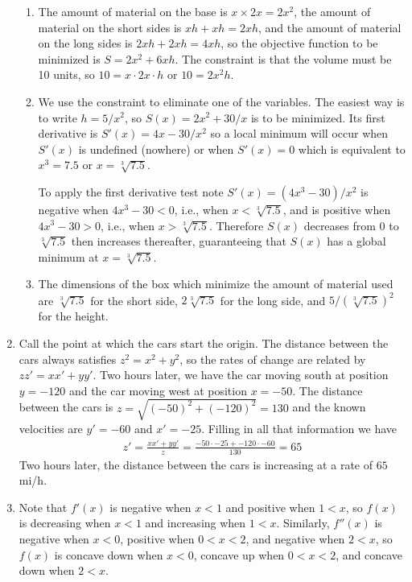 \documentclass{article}
\begin{document}
\begin{enumerate}
\begin{enumerate}
  \item The amount of material on the base is $x\times 2x=2x^2$, the
    amount of material on the short sides is $xh+xh=2xh$, and the amount
    of material on the long sides is $2xh+2xh=4xh$, so the objective
    function to be minimized is $S=2x^2+6xh$.  The constraint is that
    the volume must be 10 units, so $10=x\cdot 2x\cdot h$ or $10=2x^2h$.
  \item We use the constraint to eliminate one of the variables.  The
    easiest way is to write $h=5/x^2$, so
    $S(x) = 2x^2 + 30/x$
    is to be minimized.  Its first derivative is $S'(x)=4x-30/x^2$ so a
    local minimum will occur when $S'(x)$ is undefined (nowhere) or 
    when $S'(x)=0$ which is equivalent to $x^3=7.5$ or $x=\sqrt[3]{7.5}$.

    To apply the first derivative test note $S'(x)=(4x^3-30)/x^2$ is
    negative when $4x^3-30<0$, i.e., when $x<\sqrt[3]{7.5}$, and is
    positive when $4x^3-30>0$, i.e., when $x>\sqrt[3]{7.5}$.  Therefore
    $S(x)$ decreases from $0$ to $\sqrt[3]{7.5}$ then increases thereafter,
    guaranteeing that $S(x)$ has a global minimum at $x=\sqrt[3]{7.5}$.
  \item The dimensions of the box which minimize the amount of material
    used are $\sqrt[3]{7.5}$ for the short side, $2\sqrt[3]{7.5}$ for the
    long side, and $5/(\sqrt[3]{7.5})^2$ for the height.
  \end{enumerate}
\item Call the point at which the cars start the origin.  
  The distance between the cars always satisfies $z^2=x^2+y^2$, so the
  rates of change are related by $zz'=xx'+yy'$.
  Two hours later,
  we have the car moving south at position $y=-120$ and the car moving west
  at position $x=-50$.  The distance between the cars is $z=\sqrt{(-50)^2
  +(-120)^2}= 130$ and the known velocities are $y'=-60$ and $x'=-25$.
  Filling in all that information we have
  \begin{align*}
    z' = \frac{xx'+yy'}{z}
    = \frac{-50\cdot -25 + -120\cdot -60}{130} = 65
  \end{align*}
  Two hours later, the distance between the cars is increasing at a rate
  of $65$ mi/h.
\item Note that $f'(x)$ is negative when $x<1$ and positive when $1<x$,
  so $f(x)$ is decreasing when $x<1$ and increasing when $1<x$.  Similarly,
  $f''(x)$ is negative when $x<0$, positive when $0<x<2$, and negative
  when $2<x$, so $f(x)$ is concave down when $x<0$, concave up when
  $0<x<2$, and concave down when $2<x$.

\end{enumerate}
\end{document}
